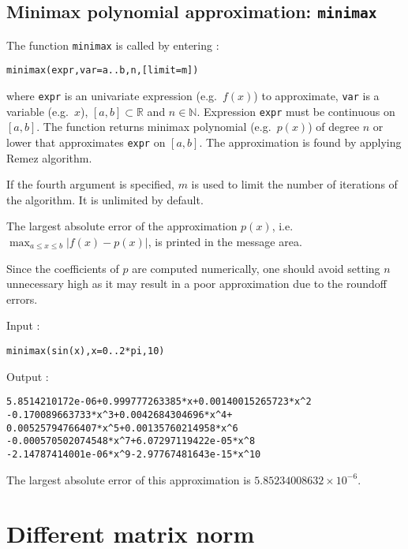 \documentclass[a4paper,11pt]{book}
\begin{document}
\subsection{Minimax polynomial approximation: {\tt minimax}}

The function {\tt minimax} is called by entering :
\begin{center}
{\tt minimax(expr,var=a..b,n,[limit=m])}
\end{center}
where {\tt expr} is an univariate expression (e.g.~$ f(x) $) to approximate, {\tt var} is a variable (e.g.~$ x $), $ [a,b]\subset\mathbb{R} $ and $ n\in\mathbb{N} $. Expression {\tt expr} must be continuous on $ [a,b] $. The function returns minimax polynomial (e.g.~$ p(x) $) of degree $ n $ or lower that approximates {\tt expr} on $ [a,b] $. The approximation is found by applying Remez algorithm.

If the fourth argument is specified, $ m $ is used to limit the number of iterations of the algorithm. It is unlimited by default.

The largest absolute error of the approximation $ p(x) $, i.e.~$ \max_{a\leq x\leq b}|f(x)-p(x)| $, is printed in the message area.

Since the coefficients of $ p $ are computed numerically, one should avoid setting $ n $ unnecessary high as it may result in a poor approximation due to the roundoff errors.

\noindent Input :
\begin{center}
{\tt minimax(sin(x),x=0..2*pi,10)}
\end{center}
Output :
\begin{center}
{\tt 5.8514210172e-06+0.999777263385*x+0.00140015265723*x\verb|^|2}\\
{\tt -0.170089663733*x\verb|^|3+0.0042684304696*x\verb|^|4+}\\
{\tt 0.00525794766407*x\verb|^|5+0.00135760214958*x\verb|^|6}\\
{\tt -0.000570502074548*x\verb|^|7+6.07297119422e-05*x\verb|^|8}\\
{\tt -2.14787414001e-06*x\verb|^|9-2.97767481643e-15*x\verb|^|10}
\end{center}
The largest absolute error of this approximation is $ 5.85234008632\times 10^{-6} $.


\section{Different matrix norm}
\end{document}
